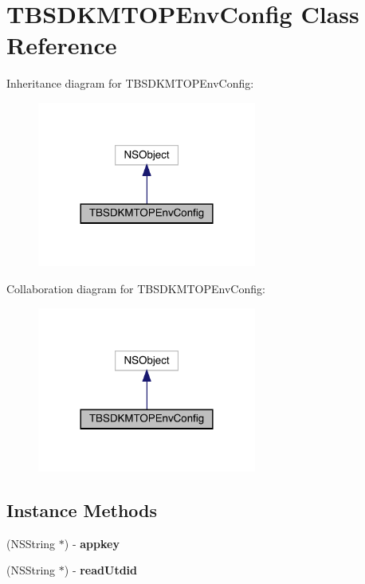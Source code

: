 \hypertarget{interface_t_b_s_d_k_m_t_o_p_env_config}{}\section{T\+B\+S\+D\+K\+M\+T\+O\+P\+Env\+Config Class Reference}
\label{interface_t_b_s_d_k_m_t_o_p_env_config}


Inheritance diagram for T\+B\+S\+D\+K\+M\+T\+O\+P\+Env\+Config\+:\nopagebreak
\begin{figure}[H]
\begin{center}
\leavevmode
\includegraphics[width=204pt]{interface_t_b_s_d_k_m_t_o_p_env_config__inherit__graph}
\end{center}
\end{figure}


Collaboration diagram for T\+B\+S\+D\+K\+M\+T\+O\+P\+Env\+Config\+:\nopagebreak
\begin{figure}[H]
\begin{center}
\leavevmode
\includegraphics[width=204pt]{interface_t_b_s_d_k_m_t_o_p_env_config__coll__graph}
\end{center}
\end{figure}
\subsection*{Instance Methods}
\begin{DoxyCompactItemize}
\item 
\mbox{\label{interface_t_b_s_d_k_m_t_o_p_env_config_acae118277cfabaea48cf5f24153a2b39}} 
(N\+S\+String $\ast$) -\/ {\bfseries appkey}
\item 
\mbox{\label{interface_t_b_s_d_k_m_t_o_p_env_config_ac44a843486b7d0a3c8986e629f71e0e0}} 
(N\+S\+String $\ast$) -\/ {\bfseries read\+Utdid}
\end{DoxyCompactItemize}
